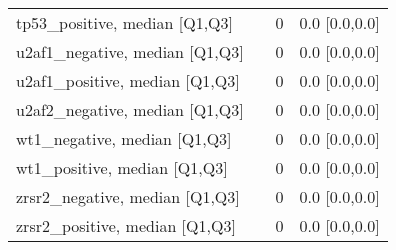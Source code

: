 \begin{tabular}{llll}
tp53\_positive, median [Q1,Q3] &    &      0 &     0.0 [0.0,0.0] \\
u2af1\_negative, median [Q1,Q3] &    &      0 &     0.0 [0.0,0.0] \\
u2af1\_positive, median [Q1,Q3] &    &      0 &     0.0 [0.0,0.0] \\
u2af2\_negative, median [Q1,Q3] &    &      0 &     0.0 [0.0,0.0] \\
wt1\_negative, median [Q1,Q3] &    &      0 &     0.0 [0.0,0.0] \\
wt1\_positive, median [Q1,Q3] &    &      0 &     0.0 [0.0,0.0] \\
zrsr2\_negative, median [Q1,Q3] &    &      0 &     0.0 [0.0,0.0] \\
zrsr2\_positive, median [Q1,Q3] &    &      0 &     0.0 [0.0,0.0] \\
\bottomrule
\end{tabular}
